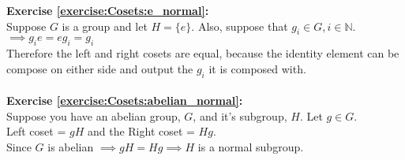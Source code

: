 \noindent\textbf{Exercise \ref{exercise:Cosets:e_normal}:}
\\
Suppose $G$ is a group and let $H = \{e\}$.  Also, suppose that $g_i \in G, i \in {\mathbb N}$.
\\
$\implies g_ie = eg_i = g_i$
\\
Therefore the left and right cosets are equal, because the identity element can be compose on either side and output the $g_i$ it is composed with.
\\
\\
\noindent\textbf{Exercise \ref{exercise:Cosets:abelian_normal}:}
\\
Suppose you have an abelian group, $G$, and it's subgroup, $H$. Let $g \in G$.
\\
Left coset = $gH$ and the Right coset = $Hg$.
\\
Since $G$ is abelian $\implies gH = Hg \implies H$ is a normal subgroup.
\\
\\

